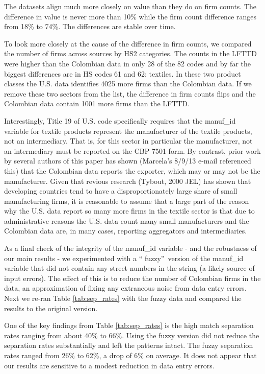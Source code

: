 \documentclass[12pt]{article}
\begin{document}
The datasets align much more closely on value than they do on firm counts.
The difference in value is never more than 10\% while the firm count
difference ranges from 18\% to 74\%. The differences are stable over time.

To look more closely at the cause of the difference in firm counts, we
compared the number of firms across sources by HS2 categories. The counts in
the LFTTD were higher than the Colombian data in only 28 of the 82 codes and
by far the biggest differences are in HS codes 61 and 62: textiles. In these
two product classes the U.S. data identifies 4025 more firms than the
Colombian data. If we remove these two sectors from the list, the difference
in firm counts flips and the Colombian data contain 1001 more firms than the
LFTTD.

Interestingly, Title 19 of U.S. code specifically requires that the
manuf\_id variable for textile products represent the manufacturer of the
textile products, not an intermediary. That is, for this sector in
particular the manufacturer, not an intermediary must be reported on the CBP
7501 form. By contrast, prior work by several authors of this paper has
shown (Marcela's 8/9/13 e-mail referenced this) that the Colombian data
reports the exporter, which may or may not be the manufacturer. Given that
revious research (Tybout, 2000 JEL) has shown that developing countries tend
to have a disproportionately large share of small manufacturing firms, it is
reasonable to assume that a large part of the reason why the U.S. data
report so many more firms in the textile sector is that due to
administrative reasons the U.S. data count many small manufacturers and the
Colombian data are, in many cases, reporting aggregators and intermediaries.

As a final check of the integrity of the manuf\_id variable - and the
robustness of our main results - we experimented with a \textquotedblleft
fuzzy\textquotedblright\ version of the manuf\_id variable that did not
contain any street numbers in the string (a likely source of input errors).
The effect of this is to reduce the number of Colombian firms in the data,
an approximation of fixing any extraneous noise from data entry errors. Next
we re-ran Table \ref{tab:sep_rates} with the fuzzy data and compared the
results to the original version.

One of the key findings from Table \ref{tab:sep_rates} is the high match
separation rates ranging from about 40\% to 66\%. Using the fuzzy version
did not reduce the separation rates substantially and left the patterns
intact. The fuzzy separation rates ranged from 26\% to 62\%, a drop of 6\%
on average. It does not appear that our results are sensitive to a modest
reduction in data entry errors.\newline
\pagebreak \bigskip
\end{document}
